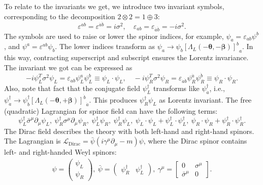 \documentclass[aps,prb,superscriptaddress,nofootinbib]{revtex4}
\begin{document}
To relate to the invariants we get, we introduce two invariant symbols, corresponding to the decomposition $2 \otimes 2 = 1 \oplus 3$:
\begin{equation}
	\varepsilon^{ab} = \varepsilon^{\dot a \dot b} = i\sigma^2, \quad
	\varepsilon_{ab} = \varepsilon_{\dot a \dot b} = -i\sigma^2.
\end{equation}
The symbols are used to raise or lower the spinor indices, for example, $\psi_a = \varepsilon_{ab}\psi^b$, and $\psi^a = \varepsilon^{ab}\psi_b$.
The lower indices transform as $\psi_a \rightarrow \psi_b {[\Lambda_L(-\bm\theta,-\bm\beta)]^b}_a$.
In this way, contracting superscript and subscript ensures the Lorentz invariance.
The invariant we got can be expressed as 
\begin{equation}
	-i\psi_L^T \sigma^2 \psi_L = \varepsilon_{ab}\psi_L^a \psi_L^b \equiv \psi_L\cdot \psi_L,\quad
	-i\psi_R^T \sigma^2 \psi_R = \varepsilon_{\dot a \dot b}\psi_R^{\dot a} \psi_R^{\dot b} \equiv \psi_R\cdot \psi_R.
\end{equation}
Also, note that fact that the conjugate field $\psi^\dagger_L$ transforms like $\psi_{\dot a}^\dagger$, i.e., $\psi_{\dot a}^\dagger \rightarrow \psi_{\dot b}^\dagger {[\Lambda_L(-\bm\theta,+\bm\beta)]^{\dot b}}_{\dot a}$.
This produces $\psi^\dagger_R \psi_L$ as Lorentz invariant.
The free (quadratic) Lagrangian for spinor field can have the following terms:
\begin{equation}
	\psi_L^\dagger \bar\sigma^\mu \partial_\mu \psi_L,\ 
	\psi_R^\dagger \sigma^\mu \partial_\mu \psi_R,\ 
	\psi_L^\dagger \psi_R,\ \psi_R^\dagger \psi_L,\ 
	\psi_L \cdot \psi_L + \psi_L^\dagger \cdot \psi_L^\dagger,\ 
	\psi_R \cdot \psi_R + \psi_R^\dagger \cdot \psi_R^\dagger.
\end{equation}
The Dirac field describes the theory with both left-hand and right-hand spinors.
The Lagrangian is $\mathcal{L}_{\mathrm{Dirac}} = \bar\psi \left(i\gamma^\mu \partial_\mu - m\right)\psi$, where the Dirac spinor contains left- and right-handed Weyl spinors:
\begin{eqnarray}
	\psi = \begin{pmatrix}
		\psi_L \\ \psi_R
	\end{pmatrix},\ 
	\bar\psi = \begin{pmatrix}
		\psi_R^\dagger & \psi_L^\dagger
	\end{pmatrix},\ 
	\gamma^\mu = \begin{bmatrix}
		0 & \sigma^\mu \\
		\bar\sigma^\mu & 0
	\end{bmatrix}.
\end{eqnarray}
\end{document}
